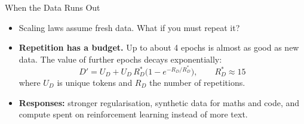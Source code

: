 \begin{frame}{When the Data Runs Out}
    \begin{itemize}\itemsep0.33em
        \item Scaling laws assume fresh data. What if you must repeat it?
        \item \textbf{Repetition has a budget.} Up to about 4 epochs is almost as good as new data. The value of further epochs decays exponentially:
        \[
            D' = U_D + U_D\,R_D^*\big(1-e^{-R_D/R_D^*}\big), \qquad R_D^*\approx 15
        \]
        where $U_D$ is unique tokens and $R_D$ the number of repetitions.
        \item \textbf{Responses:} stronger regularisation, synthetic data for maths and code, and compute spent on reinforcement learning instead of more text.
    \end{itemize}
    \vspace{0.07em}
\end{frame}


